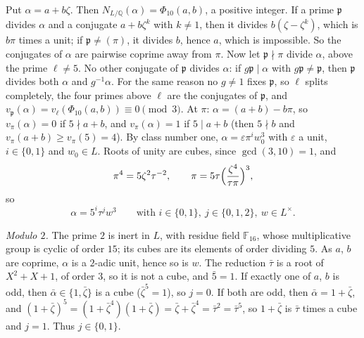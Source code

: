 \documentclass[11pt]{article}
\newcommand{\Q}{\mathbb Q}
\newcommand{\F}{\mathbb F}
\begin{document}
Put \(\alpha=a+b\zeta\). Then \(N_{L/\Q}(\alpha)=\Phi_{10}(a,b)\), a positive integer. If a prime
\(\mathfrak p\) divides \(\alpha\) and a conjugate \(a+b\zeta^k\) with \(k\neq1\), then it divides
\(b(\zeta-\zeta^k)\), which is \(b\pi\) times a unit; if \(\mathfrak p\neq(\pi)\), it divides \(b\), hence
\(a\), which is impossible. So the conjugates of \(\alpha\) are pairwise coprime away from \(\pi\).
Now let \(\mathfrak p\nmid\pi\) divide \(\alpha\), above the prime \(\ell\neq5\). No other conjugate of
\(\mathfrak p\) divides \(\alpha\): if \(g\mathfrak p\mid\alpha\) with \(g\mathfrak p\neq\mathfrak p\), then
\(\mathfrak p\) divides both \(\alpha\) and \(g^{-1}\alpha\). For the same reason no
\(g\neq1\) fixes \(\mathfrak p\), so \(\ell\) splits completely, the four primes above \(\ell\) are the
conjugates of \(\mathfrak p\), and \(v_{\mathfrak p}(\alpha)=v_\ell(\Phi_{10}(a,b))\equiv0\pmod3\). At
\(\pi\): \(\alpha=(a+b)-b\pi\), so \(v_\pi(\alpha)=0\) if \(5\nmid a+b\), and \(v_\pi(\alpha)=1\) if
\(5\mid a+b\) (then \(5\nmid b\) and \(v_\pi(a+b)\ge v_\pi(5)=4\)). By class number one,
\(\alpha=\varepsilon\pi^iw_0^3\) with \(\varepsilon\) a unit, \(i\in\{0,1\}\) and \(w_0\in L\). Roots of
unity are cubes, since \(\gcd(3,10)=1\), and
\[\pi^4=5\zeta^2\tau^{-2},\qquad\pi=5\tau\Bigl(\frac{\zeta^4}{\tau\pi}\Bigr)^3,\]
so
\[\alpha=5^i\tau^jw^3\qquad\text{with }i\in\{0,1\},\ j\in\{0,1,2\},\ w\in L^\times.\tag{7}\]

\emph{Modulo \(2\).} The prime \(2\) is inert in \(L\), with residue field \(\F_{16}\), whose
multiplicative group is cyclic of order \(15\); its cubes are its elements of order dividing \(5\). As
\(a\), \(b\) are coprime, \(\alpha\) is a \(2\)-adic unit, hence so is \(w\). The reduction
\(\bar\tau\) is a root of \(X^2+X+1\), of order \(3\), so it is not a cube, and \(\bar5=1\). If exactly
one of \(a\), \(b\) is odd, then \(\bar\alpha\in\{1,\bar\zeta\}\) is a cube (\(\bar\zeta^5=1\)), so
\(j=0\). If both are odd, then \(\bar\alpha=1+\bar\zeta\), and
\((1+\bar\zeta)^5=(1+\bar\zeta^4)(1+\bar\zeta)=\bar\zeta+\bar\zeta^4=\bar\tau^2=\bar\tau^5\), so
\(1+\bar\zeta\) is \(\bar\tau\) times a cube and \(j=1\). Thus \(j\in\{0,1\}\).
\end{document}

